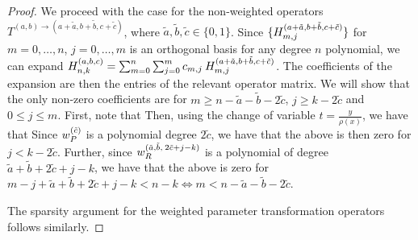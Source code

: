 \begin{proof}
We proceed with the case for the non-weighted operators $T^{(a,b)\to(a+\tilde{a},b+\tilde{b},c+\tilde{c})}$, where $\tilde{a}, \tilde{b}, \tilde{c} \in \{0,1\}$. Since $\{H^{(a+\tilde{a},b+\tilde{b},c+\tilde{c})}_{m,j}\}$ for $m = 0,\dots,n$, $j = 0,\dots,m$ is an orthogonal basis for any degree $n$ polynomial, we can expand $H_{n,k}^{(a,b,c)} = \sum_{m=0}^{n} \sum_{j=0}^m c_{m,j} \: H^{(a+\tilde{a},b+\tilde{b},c+\tilde{c})}_{m,j}$. The coefficients of the expansion are then the entries of the relevant operator matrix. We will show that the only non-zero coefficients are for $m \ge n - \tilde{a} - \tilde{b} - 2\tilde{c} $, $j \ge k-2\tilde{c}$ and $0 \le j \le m$. First, note that
Then, using the change of variable $t = \frac{y}{\rho(x)}$, we have that
Since $w_P^{(\tilde{c})}$ is a polynomial degree $2\tilde{c}$, we have that the above is then zero for $j < k-2\tilde{c}$. Further, since $w_R^{(\tilde{a}, \tilde{b}, \: 2\tilde{c}+j-k)}$ is a polynomial of degree $\tilde{a}+\tilde{b}+2\tilde{c}+j-k$, we have that the above is zero for $m-j+\tilde{a}+\tilde{b}+2\tilde{c}+j-k < n-k \iff m < n - \tilde{a}-\tilde{b}-2\tilde{c}$.

The sparsity argument for the weighted parameter transformation operators follows similarly.
\end{proof}

